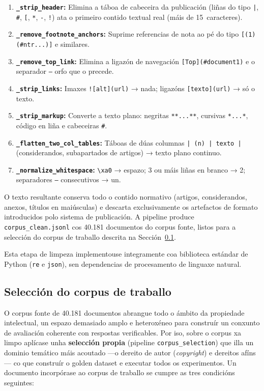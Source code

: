 \documentclass[11pt, a4paper, oneside]{report}
\begin{document}
\begin{enumerate}
  \item \textbf{\texttt{\_strip\_header}:} Elimina a táboa de cabeceira da
    publicación (liñas do tipo \texttt{|}, \texttt{\#}, \texttt{[},
    \texttt{*}, \texttt{-}, \texttt{!}) ata o primeiro contido textual real
    (máis de 15~caracteres).
  \item \textbf{\texttt{\_remove\_footnote\_anchors}:} Suprime referencias
    de nota ao pé do tipo \texttt{[(1)(\#ntr...)]} e similares.
  \item \textbf{\texttt{\_remove\_top\_link}:} Elimina a ligazón de navegación
    \texttt{[Top](\#document1)} e o separador \texttt{---} orfo que o
    precede.
  \item \textbf{\texttt{\_strip\_links}:} Imaxes \texttt{![alt](url)} → nada;
    ligazóns \texttt{[texto](url)} → só o texto.
  \item \textbf{\texttt{\_strip\_markup}:} Converte a texto plano: negritas
    \texttt{**...**}, cursivas \texttt{*...*}, código en liña e cabeceiras
    \texttt{\#}.
  \item \textbf{\texttt{\_flatten\_two\_col\_tables}:} Táboas de dúas columnas
    \texttt{| (n) | texto |} (considerandos, subapartados de artigos) → texto
    plano continuo.
  \item \textbf{\texttt{\_normalize\_whitespace}:} \texttt{\textbackslash{}xa0}
    → espazo; 3 ou máis liñas en branco → 2; separadores \texttt{---}
    consecutivos → un.
\end{enumerate}

O texto resultante conserva todo o contido normativo (artigos, considerandos,
anexos, títulos en maiúsculas) e descarta exclusivamente os artefactos de formato
introducidos polo sistema de publicación. A pipeline produce
\texttt{corpus\_clean.jsonl} cos 40.181 documentos do corpus fonte, listos para a
selección do corpus de traballo descrita na Sección~\ref{sec:corpus_traballo}.

Esta etapa de limpeza implementouse integramente coa biblioteca estándar de Python
(\texttt{re} e \texttt{json}), sen dependencias de procesamento de linguaxe natural.

\subsection{Selección do corpus de traballo}
\label{sec:corpus_traballo}

O corpus fonte de 40.181 documentos abrangue todo o ámbito da propiedade intelectual,
un espazo demasiado amplo e heteroxéneo para construír un conxunto de avaliación coherente
con respostas verificables. Por iso, sobre o corpus xa limpo aplícase unha
\textbf{selección propia} (pipeline \texttt{corpus\_selection}) que illa un dominio
temático máis acoutado —o dereito de autor (\textit{copyright}) e dereitos afíns— co que
construír o golden dataset e executar todos os experimentos. Un documento incorpórase ao
corpus de traballo se cumpre as tres condicións seguintes:
\end{document}

